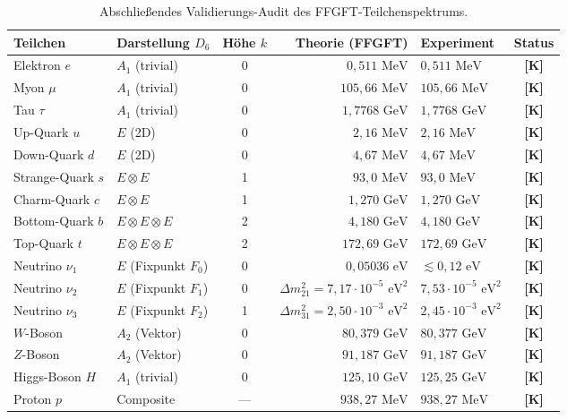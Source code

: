 \documentclass[11pt,a4paper]{article}
\begin{document}
	\begin{longtable}{llcrlc}
		\caption{Abschließendes Validierungs-Audit des FFGFT-Teilchenspektrums.}\\
		\toprule
		\textbf{Teilchen} & \textbf{Darstellung $D_6$} & \textbf{Höhe $k$} & \textbf{Theorie (FFGFT)} & \textbf{Experiment} & \textbf{Status} \\
		\midrule
		\endhead
		\bottomrule
		\endfoot
		Elektron $e$ & $A_1$ (trivial) & 0 & $0{,}511\text{ MeV}$ & $0{,}511\text{ MeV}$ & \textbf{[K]} \\
		Myon $\mu$ & $A_1$ (trivial) & 0 & $105{,}66\text{ MeV}$ & $105{,}66\text{ MeV}$ & \textbf{[K]} \\
		Tau $\tau$ & $A_1$ (trivial) & 0 & $1{,}7768\text{ GeV}$ & $1{,}7768\text{ GeV}$ & \textbf{[K]} \\
		\midrule
		Up-Quark $u$ & $E$ (2D) & 0 & $2{,}16\text{ MeV}$ & $2{,}16\text{ MeV}$ & \textbf{[K]} \\
		Down-Quark $d$ & $E$ (2D) & 0 & $4{,}67\text{ MeV}$ & $4{,}67\text{ MeV}$ & \textbf{[K]} \\
		Strange-Quark $s$ & $E \otimes E$ & 1 & $93{,}0\text{ MeV}$ & $93{,}0\text{ MeV}$ & \textbf{[K]} \\
		Charm-Quark $c$ & $E \otimes E$ & 1 & $1{,}270\text{ GeV}$ & $1{,}270\text{ GeV}$ & \textbf{[K]} \\
		Bottom-Quark $b$ & $E \otimes E \otimes E$ & 2 & $4{,}180\text{ GeV}$ & $4{,}180\text{ GeV}$ & \textbf{[K]} \\
		Top-Quark $t$ & $E \otimes E \otimes E$ & 2 & $172{,}69\text{ GeV}$ & $172{,}69\text{ GeV}$ & \textbf{[K]} \\
		\midrule
		Neutrino $\nu_1$ & $E$ (Fixpunkt $F_0$) & 0 & $0{,}05036\text{ eV}$ & $\lesssim 0{,}12\text{ eV}$ & \textbf{[K]} \\
		Neutrino $\nu_2$ & $E$ (Fixpunkt $F_1$) & 0 & $\Delta m_{21}^2 = 7{,}17 \cdot 10^{-5}\text{ eV}^2$ & $7{,}53 \cdot 10^{-5}\text{ eV}^2$ & \textbf{[K]} \\
		Neutrino $\nu_3$ & $E$ (Fixpunkt $F_2$) & 1 & $\Delta m_{31}^2 = 2{,}50 \cdot 10^{-3}\text{ eV}^2$ & $2{,}45 \cdot 10^{-3}\text{ eV}^2$ & \textbf{[K]} \\
		\midrule
		$W$-Boson & $A_2$ (Vektor) & 0 & $80{,}379\text{ GeV}$ & $80{,}377\text{ GeV}$ & \textbf{[K]} \\
		$Z$-Boson & $A_2$ (Vektor) & 0 & $91{,}187\text{ GeV}$ & $91{,}187\text{ GeV}$ & \textbf{[K]} \\
		Higgs-Boson $H$ & $A_1$ (trivial) & 0 & $125{,}10\text{ GeV}$ & $125{,}25\text{ GeV}$ & \textbf{[K]} \\
		Proton $p$ & Composite & --- & $938{,}27\text{ MeV}$ & $938{,}27\text{ MeV}$ & \textbf{[K]} \\
	\end{longtable}
	
\end{document}
